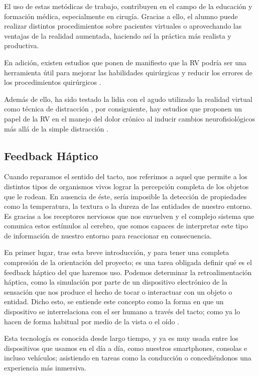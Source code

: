 El uso de estas metódicas de trabajo, contribuyen en el campo de la educación y formación médica, especialmente en cirugía. Gracias a ello, el alumno puede realizar distintos procedimientos sobre pacientes virtuales o aprovechando las ventajas de la realidad aumentada, haciendo así la práctica más realista y productiva. 

En adición, existen estudios que ponen de manifiesto que la RV podría ser una herramienta útil para mejorar las habilidades quirúrgicas y reducir los errores de los procedimientos quirúrgicos \cite{28}.

Además de ello, ha sido testado la lidia con el agudo utilizado la realidad virtual como técnica de distracción \cite{29,30}, por consiguiente, hay estudios que proponen un papel de la RV en el manejo del dolor crónico al inducir cambios neurofisiológicos más allá de la simple distracción \cite{29,31,32}.

\subsection{Feedback Háptico}
Cuando reparamos el sentido del tacto, nos referimos a aquel que permite a los distintos tipos de organismos vivos lograr la percepción completa de los objetos que le rodean. En ausencia de éste, sería imposible la detección de propiedades como la temperatura, la textura o la dureza de las entidades de nuestro entorno. Es gracias a los receptores nerviosos que nos envuelven y el complejo sistema que comunica estos estímulos al cerebro, que somos capaces de interpretar este tipo de información de nuestro entorno para reaccionar en consecuencia.

En primer lugar, tras esta breve introducción, y para tener una completa compresión de la orientación del  proyecto; es una tarea obligada definir qué es el feedback háptico del que haremos uso. Podemos determinar la retroalimentación háptica, como la simulación por parte de un dispositivo electrónico de la sensación que nos produce el hecho de tocar o interactuar con un objeto o entidad. Dicho esto, se entiende este concepto como la forma en que un dispositivo se interrelaciona con el ser humano a través del tacto; como ya lo hacen de forma habitual por medio de la vista o el oído \cite{33}.

Esta tecnología es conocida desde largo tiempo, y ya es muy usada entre los dispositivos que usamos en el día a día, como nuestros smartphones, consolas e incluso vehículos; asistiendo en tareas como la conducción o concediéndonos una experiencia más inmersiva.


